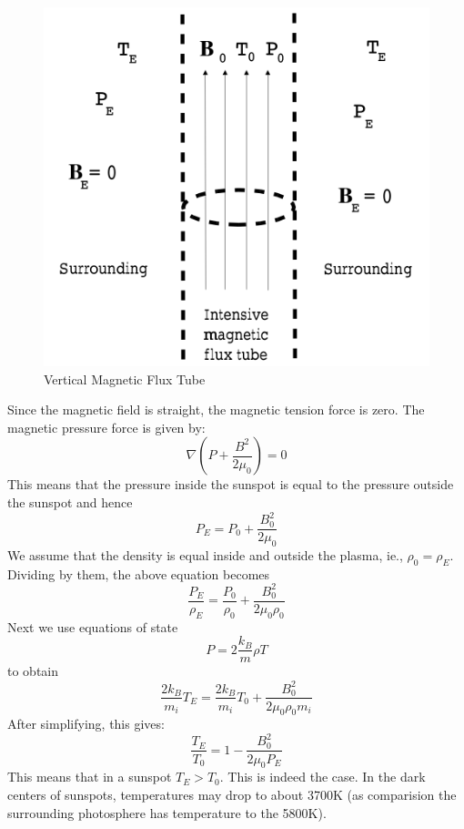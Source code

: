\documentclass[12pt]{article}
\newenvironment{changemargin}[2]{
\begin{list}{}{
\setlength{\topsep}{0pt}
\setlength{\leftmargin}{#1}
\setlength{\rightmargin}{#2}
\setlength{\listparindent}{\parindent}
\setlength{\itemindent}{\parindent}
\setlength{\parsep}{\parskip}
}
\item[]}{\end{list}}
\begin{document}
\begin{changemargin}{-2cm}{-2cm}
    \begin{figure}[h]
        \includegraphics[width=1.0\textwidth, height=0.78\textwidth]{sunspot-tube.png}
        \caption{Vertical Magnetic Flux Tube}
        \label{fig:flux-tube}
    \end{figure}

    Since the magnetic field is straight, the magnetic tension force is zero. The magnetic pressure force is given by:
    \begin{equation}
        \nabla \left(P+{\frac {B^{2}}{2\mu _{0}}}\right) = 0
    \end{equation}
    This means that the pressure inside the sunspot is equal to the pressure outside the sunspot and hence
    \begin{equation}
        P_E = P_0 + \frac{B_0^2}{2\mu_0}
    \end{equation}
    We assume that the density is equal inside and outside the plasma, ie., $\rho_0 = \rho_E$. Dividing by them, the above equation becomes
    \begin{equation}
        \frac{P_E}{\rho_E} = \frac{P_0}{\rho_0} + \frac{B_0^2}{2\mu_0\rho_0}
    \end{equation}
    Next we use equations of state
    \begin{equation}
        P = 2\frac{k_B}{m}\rho T
    \end{equation}
    to obtain
    \begin{equation}
        \frac{2k_B}{m_i}T_E = \frac{2k_B}{m_i}T_0 + \frac{B_0^2}{2\mu_0\rho_0m_i}
    \end{equation}
    After simplifying, this gives:
    \begin{equation}\label{eq:sunspot-temp}
        \frac{T_E}{T_0} = 1 - \frac{B_0^2}{2\mu_0P_E}
    \end{equation}
    This means that in a sunspot $T_E>T_0$. This is indeed the case. In the dark centers of sunspots, temperatures may drop to about 3700K (as comparision the surrounding photosphere has temperature to the 5800K).


\end{changemargin}
\end{document}
